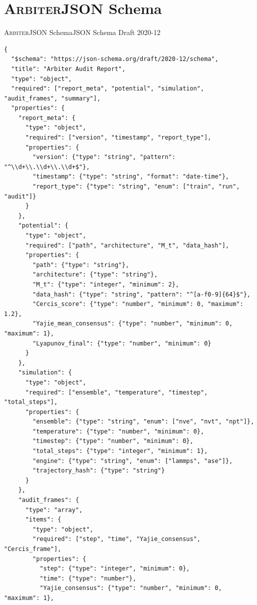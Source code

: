 \documentclass[12pt,a4paper]{article}
\theoremstyle{remark}
\newcommand{\Arbiter}{\textsc{Arbiter}}
\begin{document}
\section{\Arbiter{}JSON Schema}

\Arbiter{}JSON SchemaJSON Schema Draft 2020-12

\begin{lstlisting}[caption={ArbiterJSON Schema},label=lst:schema, basicstyle=\ttfamily\tiny]
{
  "$schema": "https://json-schema.org/draft/2020-12/schema",
  "title": "Arbiter Audit Report",
  "type": "object",
  "required": ["report_meta", "potential", "simulation", "audit_frames", "summary"],
  "properties": {
    "report_meta": {
      "type": "object",
      "required": ["version", "timestamp", "report_type"],
      "properties": {
        "version": {"type": "string", "pattern": "^\\d+\\.\\d+\\.\\d+$"},
        "timestamp": {"type": "string", "format": "date-time"},
        "report_type": {"type": "string", "enum": ["train", "run", "audit"]}
      }
    },
    "potential": {
      "type": "object",
      "required": ["path", "architecture", "M_t", "data_hash"],
      "properties": {
        "path": {"type": "string"},
        "architecture": {"type": "string"},
        "M_t": {"type": "integer", "minimum": 2},
        "data_hash": {"type": "string", "pattern": "^[a-f0-9]{64}$"},
        "Cercis_score": {"type": "number", "minimum": 0, "maximum": 1.2},
        "Yajie_mean_consensus": {"type": "number", "minimum": 0, "maximum": 1},
        "Lyapunov_final": {"type": "number", "minimum": 0}
      }
    },
    "simulation": {
      "type": "object",
      "required": ["ensemble", "temperature", "timestep", "total_steps"],
      "properties": {
        "ensemble": {"type": "string", "enum": ["nve", "nvt", "npt"]},
        "temperature": {"type": "number", "minimum": 0},
        "timestep": {"type": "number", "minimum": 0},
        "total_steps": {"type": "integer", "minimum": 1},
        "engine": {"type": "string", "enum": ["lammps", "ase"]},
        "trajectory_hash": {"type": "string"}
      }
    },
    "audit_frames": {
      "type": "array",
      "items": {
        "type": "object",
        "required": ["step", "time", "Yajie_consensus", "Cercis_frame"],
        "properties": {
          "step": {"type": "integer", "minimum": 0},
          "time": {"type": "number"},
          "Yajie_consensus": {"type": "number", "minimum": 0, "maximum": 1},

\end{lstlisting}
\end{document}
